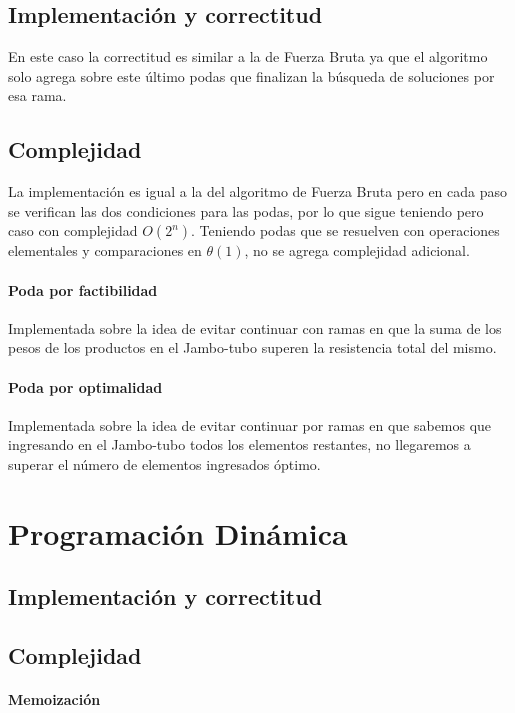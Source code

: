 \documentclass[10pt,a4paper]{article}
\begin{document}
\subsection{Implementación y correctitud}
En este caso la correctitud es similar a la de Fuerza Bruta ya que el algoritmo solo agrega sobre este último podas que finalizan la búsqueda de soluciones por esa rama.

\subsection{Complejidad}
La implementación es igual a la del algoritmo de Fuerza Bruta pero en cada paso se verifican las dos condiciones para las podas, por lo que sigue teniendo pero caso con complejidad $O(2^n)$. Teniendo podas que se resuelven con operaciones elementales y comparaciones en $\theta(1)$, no se agrega complejidad adicional.

\paragraph{Poda por factibilidad}
Implementada sobre la idea de evitar continuar con ramas en que la suma de los pesos de los productos en el Jambo-tubo superen la resistencia total del mismo.

\paragraph{Poda por optimalidad}
Implementada sobre la idea de evitar continuar por ramas en que sabemos que ingresando en el Jambo-tubo todos los elementos restantes, no llegaremos a superar el número de elementos ingresados óptimo.

\section{Programación Dinámica} \label{sec:dp}

\subsection{Implementación y correctitud}

\subsection{Complejidad}

\paragraph{Memoización}
\end{document}
